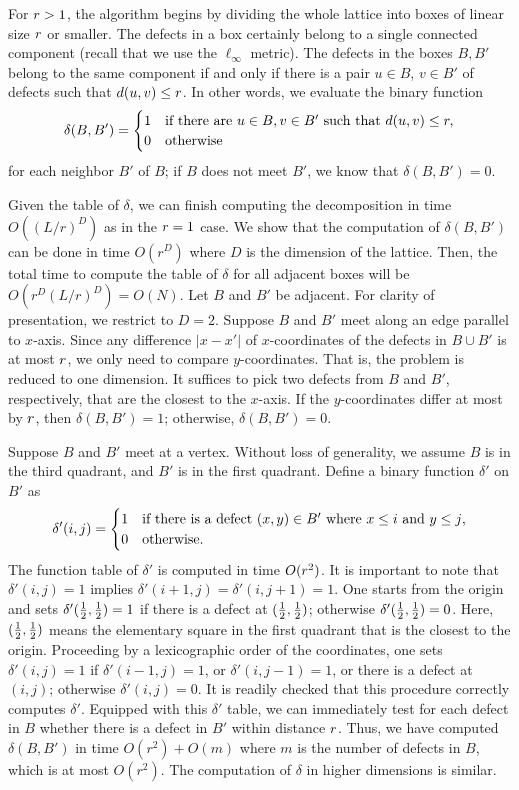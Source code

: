 For $r > 1$, the algorithm begins by dividing the whole lattice
into boxes of linear size $r$ or smaller.
The defects in a box certainly belong to a single connected component
(recall that we use the $\ell_\infty$ metric).
The defects in the boxes $B, B'$ belong to the same component
if and only if there is a pair $u \in B$, $v \in B'$ of defects
such that $d(u,v) \le r$.
In other words, we evaluate the binary function
\[
 \delta(B, B') =
\begin{cases}
1 & \text{if there are $u \in B, v \in B'$ such that } d(u,v) \le r ,\\
0 & \text{otherwise}
\end{cases}
\]
for each neighbor $B'$ of $B$;
if $B$ does not meet $B'$,
we know that $\delta(B,B') = 0$.

Given the table of $\delta$,
we can finish computing the decomposition
in time $O((L/r)^D)$ as in the $r = 1$ case.
We show that the computation of $\delta(B,B')$ can be done
in time $O(r^D)$ where $D$ is the dimension of the lattice.
Then, the total time to compute the table of $\delta$ for all adjacent boxes
will be $O(r^D (L/r)^D )=O(N)$.
Let $B$ and $B'$ be adjacent.
For clarity of presentation, we restrict to $D=2$.
Suppose $B$ and $B'$ meet along an edge parallel to $x$-axis.
Since any difference $|x-x'|$ of $x$-coordinates
of the defects in $B\cup B'$ is at most $r$,
we only need to compare $y$-coordinates.
That is, the problem is reduced to one dimension.
It suffices to pick two defects from $B$ and $B'$, respectively,
that are the closest to the $x$-axis.
If the $y$-coordinates differ at most by $r$,
then $\delta(B,B') = 1$;
otherwise, $\delta(B,B')=0$.

Suppose $B$ and $B'$ meet at a vertex.
Without loss of generality, we assume $B$ is in the third quadrant,
and $B'$ is in the first quadrant.
Define a binary function $\delta'$ on $B'$ as
\[
 \delta'(i,j)=
\begin{cases}
 1 & \text{if there is a defect $(x,y) \in B'$ where $ x \le i$ and $ y \le j$}, \\
 0 & \text{otherwise}.
\end{cases}
\]
The function table of $\delta'$ is computed in time $O(r^2)$.
It is important to note that $\delta'(i,j) = 1$ implies $\delta'(i+1,j) = \delta'(i,j+1)=1$.
One starts from the origin and sets $\delta'(\frac{1}{2},\frac{1}{2})=1$
if there is a defect at $(\frac{1}{2},\frac{1}{2})$; otherwise $\delta'(\frac{1}{2},\frac{1}{2})=0$.
Here, $(\frac{1}{2},\frac{1}{2})$ means the elementary square in the first quadrant
that is the closest to the origin.
Proceeding by a lexicographic order of the coordinates,
one sets $\delta'(i,j) = 1$
if $\delta'(i-1,j)=1$, or $\delta'(i,j-1)=1$, or there is a defect at $(i,j)$;
otherwise $\delta'(i,j)=0$.
It is readily checked that this procedure correctly computes $\delta'$.
Equipped with this $\delta'$ table,
we can immediately test for each defect in $B$
whether there is a defect in $B'$ within distance $r$.
Thus, we have computed $\delta(B,B')$ in time $O(r^2)+O(m)$
where $m$ is the number of defects in $B$,
which is at most $O(r^2)$.
The computation of $\delta$ in higher dimensions is similar.

